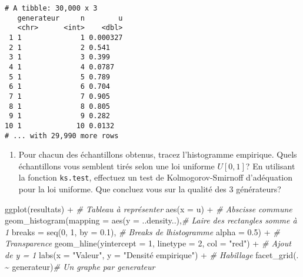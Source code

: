 \documentclass[
]{article}
\newenvironment{Shaded}{\begin{snugshade}}{\end{snugshade}}
\newcommand{\AttributeTok}[1]{\textcolor[rgb]{0.77,0.63,0.00}{#1}}
\newcommand{\CommentTok}[1]{\textcolor[rgb]{0.56,0.35,0.01}{\textit{#1}}}
\newcommand{\DecValTok}[1]{\textcolor[rgb]{0.00,0.00,0.81}{#1}}
\newcommand{\FloatTok}[1]{\textcolor[rgb]{0.00,0.00,0.81}{#1}}
\newcommand{\FunctionTok}[1]{\textcolor[rgb]{0.00,0.00,0.00}{#1}}
\newcommand{\NormalTok}[1]{#1}
\newcommand{\SpecialCharTok}[1]{\textcolor[rgb]{0.00,0.00,0.00}{#1}}
\newcommand{\StringTok}[1]{\textcolor[rgb]{0.31,0.60,0.02}{#1}}
\providecommand{\tightlist}{%
  \setlength{\itemsep}{0pt}\setlength{\parskip}{0pt}}
\begin{document}
\begin{verbatim}
# A tibble: 30,000 x 3
   generateur     n        u
   <chr>      <int>    <dbl>
 1 1              1 0.000327
 2 1              2 0.541   
 3 1              3 0.399   
 4 1              4 0.0787  
 5 1              5 0.789   
 6 1              6 0.704   
 7 1              7 0.905   
 8 1              8 0.805   
 9 1              9 0.282   
10 1             10 0.0132  
# ... with 29,990 more rows
\end{verbatim}

\begin{enumerate}
\def\labelenumi{\arabic{enumi}.}
\setcounter{enumi}{2}
\tightlist
\item
  Pour chacun des échantillons obtenus, tracez l'histogramme empirique.
  Quels échantillons vous semblent tirés selon une loi uniforme
  \(U[0, 1]\)? En utilisant la fonction \texttt{ks.test}, effectuez un
  test de Kolmogorov-Smirnoff d'adéquation pour la loi uniforme. Que
  concluez vous sur la qualité des 3 générateurs?
\end{enumerate}

\begin{Shaded}
\begin{Highlighting}[]
\FunctionTok{ggplot}\NormalTok{(resultats) }\SpecialCharTok{+} \CommentTok{\# Tableau à représenter}
  \FunctionTok{aes}\NormalTok{(}\AttributeTok{x =}\NormalTok{ u) }\SpecialCharTok{+} \CommentTok{\# Abscisse commune}
  \FunctionTok{geom\_histogram}\NormalTok{(}\AttributeTok{mapping =} \FunctionTok{aes}\NormalTok{(}\AttributeTok{y =}\NormalTok{ ..density..),}\CommentTok{\# L\textquotesingle{}aire des rectangles somme à 1}
                 \AttributeTok{breaks =} \FunctionTok{seq}\NormalTok{(}\DecValTok{0}\NormalTok{, }\DecValTok{1}\NormalTok{, }\AttributeTok{by =} \FloatTok{0.1}\NormalTok{), }\CommentTok{\# Breaks de l\textquotesingle{}histogramme  }
                 \AttributeTok{alpha =} \FloatTok{0.5}\NormalTok{) }\SpecialCharTok{+} \CommentTok{\# Transparence}
  \FunctionTok{geom\_hline}\NormalTok{(}\AttributeTok{yintercept =} \DecValTok{1}\NormalTok{, }\AttributeTok{linetype =} \DecValTok{2}\NormalTok{, }\AttributeTok{col =} \StringTok{"red"}\NormalTok{) }\SpecialCharTok{+} \CommentTok{\# Ajout de y = 1}
  \FunctionTok{labs}\NormalTok{(}\AttributeTok{x =} \StringTok{"Valeur"}\NormalTok{, }\AttributeTok{y =} \StringTok{"Densité empirique"}\NormalTok{) }\SpecialCharTok{+} \CommentTok{\# Habillage}
  \FunctionTok{facet\_grid}\NormalTok{(. }\SpecialCharTok{\textasciitilde{}}\NormalTok{ generateur)}\CommentTok{\# Un graphe par generateur}
\end{Highlighting}
\end{Shaded}
\end{document}

